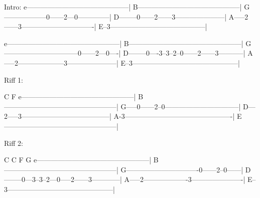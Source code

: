 \begin{lsttab}
Intro:
e--------------------------------------------|
B--------------------------------------------|
G------------------0------2---0--------------|
D--------0------2------3---------------------|
A-----2------3-------------------------------|
E--3-----------------------------------------|

e------------------------------------------------|
B------------------------------------------------|
G--------------------------------0------2---0----|
D--------0----3--3--2--0------2------3-----------|
A-----2--------------------3---------------------|
E--3---------------------------------------------|

Riff 1:

   C      F
e------------------------------------------------|
B------------------------------------------------|
G-----0------2--0--------------------------------|
D---2-----3--------------------------------------|
A-3----------------------------------------------|
E------------------------------------------------|

Riff 2:

 C      C              F        G                     
e------------------------------------------------|
B------------------------------------------------|
G-------------------------------0------2--0------|
D--------0---3--3--2---0-----2------3------------|
A-----2-------------------3----------------------|
E--3---------------------------------------------|
\end{lsttab}
\newpage

